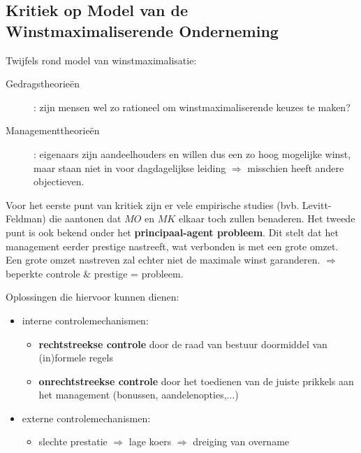 \subsection{Kritiek op Model van de Winstmaximaliserende Onderneming}
Twijfels rond model van winstmaximalisatie:
\begin{description}
	\item[Gedragstheorie\"en]: zijn mensen wel zo rationeel om winstmaximaliserende keuzes te maken?
	\item[Managementtheorie\"en]: eigenaars zijn aandeelhouders en willen dus een zo hoog mogelijke winst, maar staan niet in voor dagdagelijkse leiding $\Rightarrow$ misschien heeft andere objectieven.
\end{description}

Voor het eerste punt van kritiek zijn er vele empirische studies (bvb. Levitt-Feldman) die aantonen dat $MO$ en $MK$ elkaar toch zullen benaderen. Het tweede punt is ook bekend onder het \textbf{principaal-agent probleem}. Dit stelt dat het management eerder prestige nastreeft, wat verbonden is met een grote omzet. Een grote omzet nastreven zal echter niet de maximale winst garanderen. $\Rightarrow$ beperkte controle \& prestige = probleem.

Oplossingen die hiervoor kunnen dienen:
\begin{itemize}
	\item interne controlemechanismen:
	\begin{itemize}
		\item \textbf{rechtstreekse controle} door de raad van bestuur doormiddel van (in)formele regels
		\item \textbf{onrechtstreekse controle} door het toedienen van de juiste prikkels aan het management (bonussen, aandelenopties,...)
	\end{itemize}
	\item externe controlemechanismen: 
	\begin{itemize}
		\item slechte prestatie $\Rightarrow$ lage koers $\Rightarrow$ dreiging van overname
	\end{itemize}
\end{itemize}